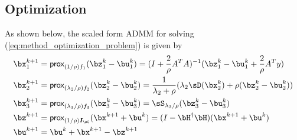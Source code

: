 \documentclass[11pt]{article}
\renewcommand{\sI}{\boldsymbol{I}}
\newcommand{\prox}{\textsf{prox}}
\begin{document}
\subsection{Optimization}

As shown below, the scaled form ADMM for solving (\ref{eq:method_optimization_problem}) is given by 
\begin{align*}
    \bx_1^{k+1}
        &= \prox_{(1/\rho)f_1}(\bz_1^k - \bu_1^k) 
        = (I + \frac{2}{\rho} A^TA)^{-1} ( \bz_1^k - \bu_1^k + \frac{2}{\rho}A^T y) \\
    \bx_2^{k+1}
        &= \prox_{(\lambda_2/\rho)f_2}(\bz_2^k - \bu_2^k) 
        = \frac{1}{\lambda_2+\rho} (\lambda_2 \sD(\bx_2^k) + \rho(\bz_2^k - \bu_2^k)) \\
    \bx_3^{k+1}
        &= \prox_{(\lambda_3/\rho)f_3} (\bz_3^k - \bu_3^k) 
        = \sS_{\lambda_3/\rho}(\bz_3^k - \bu_3^k) \\
    \bz^{k+1}
        &= \prox_{(1/\rho)\sI_{\sC}}(\bx^{k+1} + \bu^k)
        = (I - \bH^{\dagger}\bH)(\bx^{k+1}+\bu^k) \\
    \bu^{k+1}
        &= \bu^{k} + \bx^{k+1} - \bz^{k+1}
\end{align*}

 
 



\newpage
\printbibliography
\end{document}

